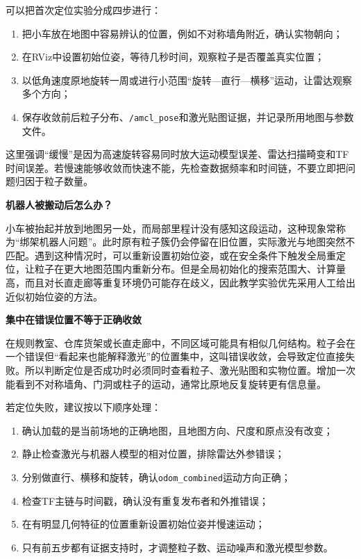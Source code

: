 \documentclass[UTF8,zihao=-4]{ctexart}
\DeclareRobustCommand{\code}[1]{\texttt{#1}}
\begin{document}
可以把首次定位实验分成四步进行：

\begin{enumerate}
  \item 把小车放在地图中容易辨认的位置，例如不对称墙角附近，确认实物朝向；
  \item 在RViz中设置初始位姿，等待几秒时间，观察粒子是否覆盖真实位置；
  \item 以低角速度原地旋转一周或进行小范围“旋转—直行—横移”运动，让雷达观察多个方向；
  \item 保存收敛前后粒子分布、\code{/amcl\_pose}和激光贴图证据，并记录所用地图与参数文件。
\end{enumerate}

这里强调“缓慢”是因为高速旋转容易同时放大运动模型误差、雷达扫描畸变和TF时间误差。若慢速能够收敛而快速不能，先检查数据频率和时间链，不要立即把问题归因于粒子数量。

\textbf{机器人被搬动后怎么办？}

小车被抬起并放到地图另一处，而局部里程计没有感知这段运动，这种现象常称为“绑架机器人问题”。此时原有粒子簇仍会停留在旧位置，实际激光与地图突然不匹配。遇到这种情况时，可以重新设置初始位姿，或在安全条件下触发全局重定位，让粒子在更大地图范围内重新分布。但是全局初始化的搜索范围大、计算量高，而且对长直走廊等重复环境仍可能存在歧义，因此教学实验优先采用人工给出近似初始位姿的方法。

\textbf{集中在错误位置不等于正确收敛}

在规则教室、仓库货架或长直走廊中，不同区域可能具有相似几何结构。粒子会在一个错误但“看起来也能解释激光”的位置集中，这叫错误收敛，会导致定位直接失败。所以判断定位是否成功时必须同时查看粒子、激光贴图和实物位置。增加一次能看到不对称墙角、门洞或柱子的运动，通常比原地反复旋转更有信息量。

若定位失败，建议按以下顺序处理：

\begin{enumerate}
  \item 确认加载的是当前场地的正确地图，且地图方向、尺度和原点没有改变；
  \item 静止检查激光与机器人模型的相对位置，排除雷达外参错误；
  \item 分别做直行、横移和旋转，确认\code{odom\_combined}运动方向正确；
  \item 检查TF主链与时间戳，确认没有重复发布者和外推错误；
  \item 在有明显几何特征的位置重新设置初始位姿并慢速运动；
  \item 只有前五步都有证据支持时，才调整粒子数、运动噪声和激光模型参数。
\end{enumerate}
\end{document}
